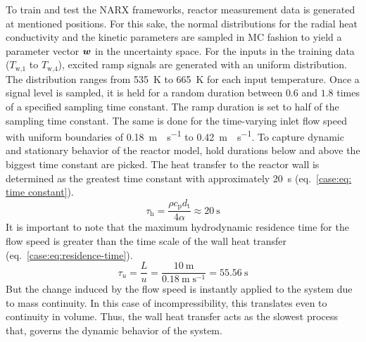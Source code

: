 To train and test the NARX frameworks, reactor measurement data is generated at mentioned positions. 
For this sake, the normal distributions for the radial heat conductivity and the kinetic parameters 
are sampled in MC fashion to yield a parameter vector ${\bm{w}}$ in the uncertainty space.
For the inputs in the training data ($T_{\text{w,1}}$ to $T_{\text{w,4}}$), excited ramp signals are generated with an
uniform distribution. The distribution ranges from \SI{535}{\kelvin} to \SI{665}{\kelvin} for each input temperature.
Once a signal level is sampled, it is held for a random duration between $0.6$ and $1.8$ times of 
a specified sampling time constant. The ramp duration is set to half of the sampling time constant.
The same is done for the time-varying inlet flow speed with uniform boundaries of 
\SI{0.18}{\meter \; \second^{-1}} to \SI{0.42}{\meter \; \second^{-1}}.
To capture dynamic and stationary behavior of the reactor model, hold durations below and above the 
biggest time constant are picked.
The heat transfer to the reactor wall is determined as the greatest time constant with
approximately \SI{20}{\second} (eq.~\ref{case:eq: time constant}).
\begin{equation}
    \label{case:eq: time constant}
    \tau_\text{h} = \frac{\rho c_\text{p} d_\text{t}}{4 \alpha} \approx \SI{20}{\second}
\end{equation}
\newline
\noindent
It is important to note that the maximum hydrodynamic residence time for the flow speed is greater than the time
scale of the wall heat transfer (eq.~\ref{case:eq:residence-time}).
\begin{equation}
    \label{case:eq:residence-time}
    \tau_u = \frac{L}{u} = \frac{\SI{10}{\meter}}{\SI{0.18}{\meter \; \second^{-1}}}
    = \SI{55.56}{\second}
\end{equation}
But the change induced by the flow speed is instantly applied to the system due to 
mass continuity. In this case of incompressibility, this translates even to continuity
in volume. Thus, the wall heat transfer acts as the slowest process
that, governs the dynamic behavior of the system. 
\newline

